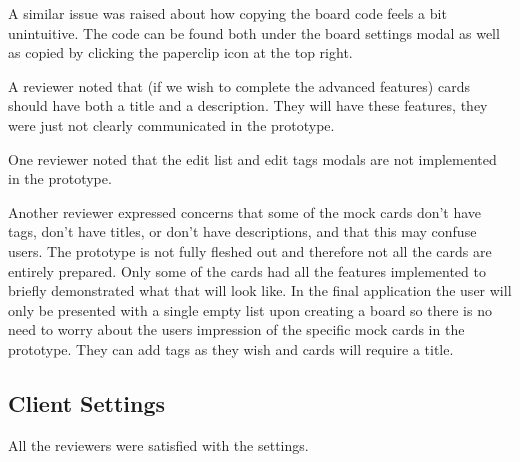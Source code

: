     A similar issue was raised about how copying the board code feels a bit unintuitive. The code can be found both under the board settings modal as well as copied by clicking the paperclip icon at the top right.

    A reviewer noted that (if we wish to complete the advanced features) cards should have both a title and a description. They will have these features, they were just not clearly communicated in the prototype.

    One reviewer noted that the edit list and edit tags modals are not implemented in the prototype. 

    Another reviewer expressed concerns that some of the mock cards don't have tags, don't have titles, or don't have descriptions, and that this may confuse users. The prototype is not fully fleshed out and therefore not all the cards are entirely prepared. Only some of the cards had all the features implemented to briefly demonstrated what that will look like. In the final application the user will only be presented with a single empty list upon creating a board so there is no need to worry about the users impression of the specific mock cards in the prototype. They can add tags as they wish and cards will require a title.

\subsection{Client Settings}

    All the reviewers were satisfied with the settings.
    
